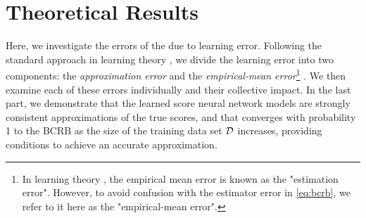 \section{Theoretical Results}\label{sec:theory}
Here, we %
investigate the errors of the \name{} due to learning error. %
{Following the standard approach in } learning theory \cite[Chapter 5]{shalev2014understanding}, we divide the learning error into two components: the \emph{approximation error} and the \emph{empirical-mean error}\footnote{In {learning theory} \cite[Chapter 5]{shalev2014understanding}, the empirical mean error is %
known as the "estimation error". However, to avoid confusion with the estimator error %
in \eqref{eq:bcrb}, we %
refer to it here as the "empirical-mean error".} . We then examine each of these errors individually and their collective impact.
 In the last part, we demonstrate that the {learned score neural network models are strongly consistent approximations of}  %
 the true scores, and that \name{} converges {with probability 1 to the BCRB as the size of the training data set $\mathcal{D}$ increases,} providing conditions to achieve an accurate approximation. 




